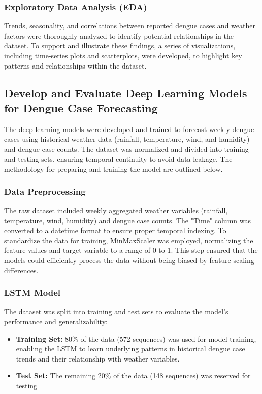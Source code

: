 \subsubsection{Exploratory Data Analysis (EDA)}
Trends, seasonality, and correlations between reported dengue cases and weather factors were thoroughly analyzed to identify potential relationships in the dataset. To support and illustrate these findings, a series of visualizations, including time-series plots and scatterplots, were developed, to highlight key patterns and relationships within the dataset. 

\subsection{Develop and Evaluate Deep Learning Models for Dengue Case Forecasting}
The deep learning models were developed and trained to forecast weekly dengue cases using historical weather data (rainfall, temperature, wind, and humidity) and dengue case counts. The dataset was normalized and divided into training and testing sets, ensuring temporal continuity to avoid data leakage. The methodology for preparing and training the model are outlined below.
\subsubsection{Data Preprocessing}
The raw dataset included weekly aggregated weather variables (rainfall, temperature, wind, humidity) and dengue case counts. The "Time" column was converted to a datetime format to ensure proper temporal indexing. To standardize the data for training, MinMaxScaler was employed, normalizing the feature values and target variable to a range of 0 to 1. This step ensured that the models could efficiently process the data without being biased by feature scaling differences.

\subsubsection{LSTM Model}
The dataset was split into training and test sets to evaluate the model’s performance and generalizability:
\begin{itemize}
	\item \textbf{Training Set:} 80\% of the data (572 sequences) was used for model training, enabling the LSTM to learn underlying patterns in historical dengue case trends and their relationship with weather variables.
	\item \textbf{Test Set:} The remaining 20\% of the data (148 sequences) was reserved for testing
\end{itemize}

